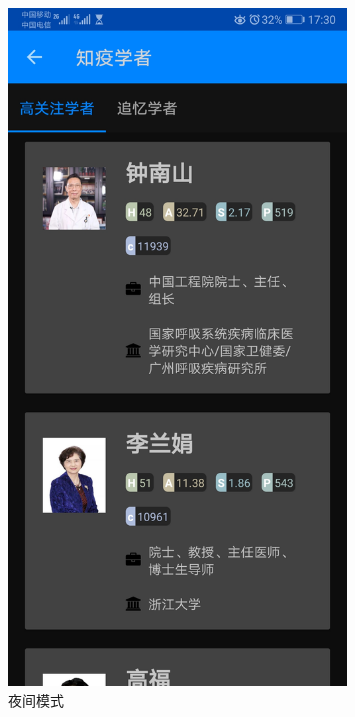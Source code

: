 \documentclass[UTF8]{article}
\begin{document}
\begin{figure}[htbp]
{\begin{minipage}[t]{0.25\linewidth}
    \includegraphics[width=0.8\textwidth]{nightmode4}
    \end{minipage}%
    }%

    \centering
    \caption{夜间模式}
    \end{figure}

\end{document}
